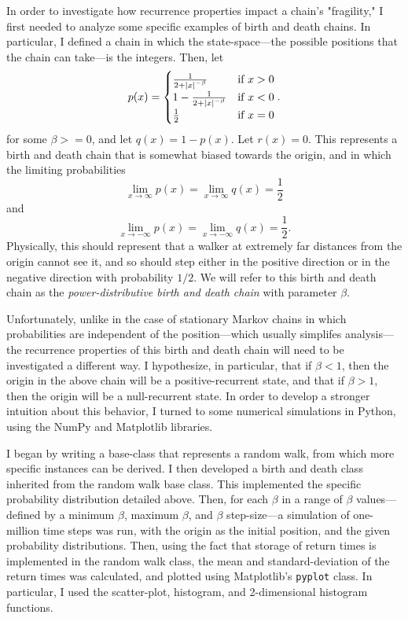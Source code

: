In order to investigate how recurrence properties impact a chain's "fragility," I first needed to
analyze some specific examples of birth and death chains. In particular, I defined a chain in which the
state-space---the possible positions that the chain can take---is the integers. Then, let
\[
    p(x) = \begin{cases}
        \frac{1}{2+\left\vert x \right\vert^{-\beta}} & \text{if } x > 0 \\
        1 - \frac{1}{2+\left\vert x \right\vert^{-\beta}} & \text{if } x < 0 \\
        \frac{1}{2} & \text{if } x = 0
    \end{cases}.
\]
for some $\beta >= 0$, and let $q(x) = 1 - p(x)$. Let $r(x) = 0$. This represents a birth and death
chain that is somewhat biased towards the origin, and in which the limiting probabilities
\[
    \lim_{x \to \infty} p(x) = \lim_{x \to \infty} q(x) = \frac{1}{2}  
\]
and
\[
    \lim_{x \to -\infty} p(x) = \lim_{x \to -\infty} q(x) = \frac{1}{2}.  
\]
Physically, this should represent that a walker at extremely far distances from the origin cannot see
it, and so should step either in the positive direction or in the negative direction with probability
$1/2$. We will refer to this birth and death chain as the \emph{power-distributive birth and death
chain} with parameter $\beta$.

Unfortunately, unlike in the case of stationary Markov chains in which probabilities are independent of
the position---which usually simplifes analysis---the recurrence properties of this birth and death
chain will need to be investigated a different way. I hypothesize, in particular, that if $\beta < 1$,
then the origin in the above chain will be a positive-recurrent state, and that if $\beta > 1$, then the
origin will be a null-recurrent state. In order to develop a stronger intuition about this behavior, I
turned to some numerical simulations in Python, using the NumPy and Matplotlib libraries.

I began by writing a base-class that represents a random walk, from which more specific instances can be
derived. I then developed a birth and death class inherited from the random walk base class. This
implemented the specific probability distribution detailed above. Then, for each $\beta$ in a range of
$\beta$ values---defined by a minimum $\beta$, maximum $\beta$, and $\beta$ step-size---a simulation of
one-million time steps was run, with the origin as the initial position, and the given probability
distributions. Then, using the fact that storage of return times is implemented in the random walk
class, the mean and standard-deviation of the return times was calculated, and plotted using
Matplotlib's \texttt{pyplot} class. In particular, I used the scatter-plot, histogram, and
2-dimensional histogram functions.

